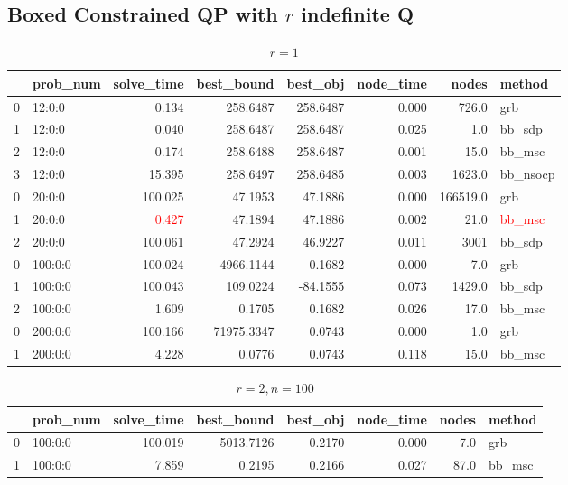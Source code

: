 \documentclass[a4paper, 10pt]{article}
\newcommand{\red}[1]{\textcolor{red}{#1}}
\begin{document}
\subsection{Boxed Constrained QP with \(r\) indefinite Q}
\scriptsize
\begin{table}[h!]
    \begin{tabular}{llrrrrrl}
        \toprule
        {} & prob\_num & solve\_time & best\_bound & best\_obj & node\_time & nodes    & method        \\
        \midrule
        0  & 12:0:0    & 0.134       & 258.6487    & 258.6487  & 0.000      & 726.0    & grb           \\
        1  & 12:0:0    & 0.040       & 258.6487    & 258.6487  & 0.025      & 1.0      & bb\_sdp       \\
        2  & 12:0:0    & 0.174       & 258.6488    & 258.6487  & 0.001      & 15.0     & bb\_msc       \\
        3  & 12:0:0    & 15.395      & 258.6497    & 258.6485  & 0.003      & 1623.0   & bb\_nsocp     \\
        \midrule
        0  & 20:0:0    & 100.025     & 47.1953     & 47.1886   & 0.000      & 166519.0 & grb           \\
        1  & 20:0:0    & \red{0.427} & 47.1894     & 47.1886   & 0.002      & 21.0     & \red{bb\_msc} \\
        2  & 20:0:0    & 100.061     & 47.2924     & 46.9227   & 0.011      & 3001     & bb\_sdp       \\
        \midrule
        0  & 100:0:0   & 100.024     & 4966.1144   & 0.1682    & 0.000      & 7.0      & grb           \\
        1  & 100:0:0   & 100.043     & 109.0224    & -84.1555  & 0.073      & 1429.0   & bb\_sdp       \\
        2  & 100:0:0   & 1.609       & 0.1705      & 0.1682    & 0.026      & 17.0     & bb\_msc       \\
        \midrule
        0  & 200:0:0   & 100.166     & 71975.3347  & 0.0743    & 0.000      & 1.0      & grb           \\
        1  & 200:0:0   & 4.228       & 0.0776      & 0.0743    & 0.118      & 15.0     & bb\_msc       \\
        \bottomrule
    \end{tabular}
    \caption{\(r=1\)}

\end{table}
\begin{table}[h!]
    \begin{tabular}{llrrrrrl}
        \toprule
        {} & prob\_num & solve\_time & best\_bound & best\_obj & node\_time & nodes & method  \\
        \midrule
        0  & 100:0:0   & 100.019     & 5013.7126   & 0.2170    & 0.000      & 7.0   & grb     \\
        1  & 100:0:0   & 7.859       & 0.2195      & 0.2166    & 0.027      & 87.0  & bb\_msc \\
        \bottomrule
    \end{tabular}
    \caption{\(r=2, n=100\)}
\end{table}
\end{document}
